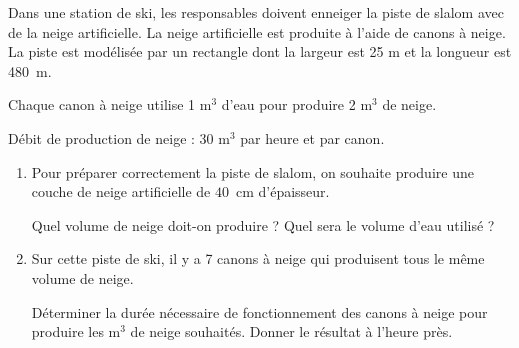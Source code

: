 
\medskip

Dans une station de ski, les responsables doivent enneiger la piste de slalom avec de la neige artificielle. La neige artificielle est produite à l'aide de canons à neige. La piste est modélisée par un rectangle dont la largeur est 25 m et la longueur est 480~m.

Chaque canon à neige utilise 1 m$^3$ d'eau pour produire 2 m$^3$ de neige.

Débit de production de neige : 30 m$^3$ par heure
et par canon.

\medskip

\begin{enumerate}
\item Pour préparer correctement la piste de slalom, on souhaite produire une couche de neige artificielle de $40$~cm d'épaisseur.

Quel volume de neige doit-on produire ? Quel sera le volume d'eau utilisé ?
\item Sur cette piste de ski, il y a 7 canons à neige qui produisent tous le même volume de neige.

Déterminer la durée nécessaire de fonctionnement des canons à neige pour produire les  m$^3$ de neige souhaités. Donner le résultat à l'heure près.
\end{enumerate}

\vspace{0,5cm}

